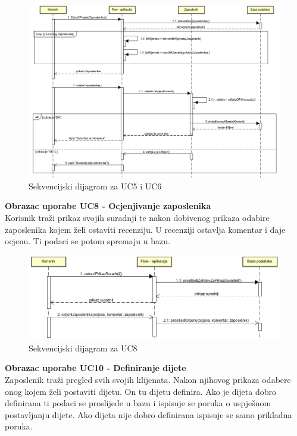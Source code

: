 			
				\begin{figure}[H]
				\includegraphics[scale=0.75]{dijagrami/Sekvencijski/SD5.PNG}
				\centering
				\caption{Sekvencijski dijagram za UC5 i UC6}
				\label{fig:promjene}
				\end{figure}
				\eject
				
				\textbf{Obrazac uporabe UC8 - Ocjenjivanje zaposlenika}\\
				Korisnik traži prikaz svojih suradnji te nakon dobivenog prikaza odabire zaposlenika kojem želi ostaviti recenziju. U recenziji ostavlja komentar i daje ocjenu. Ti podaci se potom spremaju u bazu.
				
				
				\begin{figure}[H]
				\includegraphics[scale=0.85]{dijagrami/Sekvencijski/SD8.PNG}
				\centering
				\caption{Sekvencijski dijagram za UC8}
				\label{fig:promjene}
				\end{figure}
				\eject
				
				\textbf{Obrazac uporabe UC10 - Definiranje dijete}\\
				Zaposlenik traži pregled svih svojih klijenata. Nakon njihovog prikaza odabere onog kojem želi postaviti dijetu. On tu dijetu definira. Ako je dijeta dobro definirana ti podaci se proslijede u bazu i ispisuje se poruka o uspješnom postavljanju dijete. Ako dijeta nije dobro definirana ispisuje se samo prikladna poruka.
				
